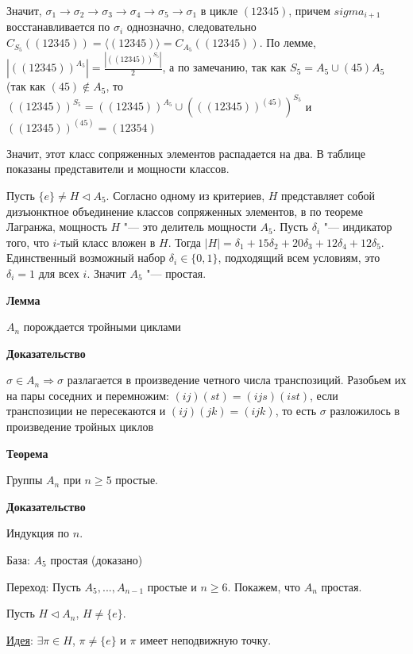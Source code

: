\documentclass{article}
\begin{document}
Значит, $\sigma_1 \rightarrow \sigma_2 \rightarrow \sigma_3 \rightarrow \sigma_4 \rightarrow \sigma_5 \rightarrow \sigma_1$ в цикле $(1 2 3 4 5)$, причем $sigma_{i+1}$ восстанавливается по $\sigma_i$ однозначно, следовательно $C_{S_5}((1 2 3 4 5)) = \langle (1 2 3 4 5) \rangle = C_{A_5}((1 2 3 4 5))$. По лемме, $|((1 2 3 4 5))^{A_5}| = \frac{|((1 2 3 4 5))^{S_5}|}{2}$, а по замечанию, так как  $S_5 = A_5 \cup (4 5)A_5$ (так как $(4 5) \notin A_5$, то $((1 2 3 4 5))^{S_5} = ((1 2 3 4 5))^{A_5} \cup (((1 2 3 4 5))^{(4 5)})^{S_5}$ и $((1 2 3 4 5))^{(4 5)} = (1 2 3 5 4)$

Значит, этот класс сопряженных элементов распадается на два. В таблице показаны представители и мощности классов.

Пусть $\{e\} \neq H \triangleleft A_5$. Согласно одному из критериев, $H$ представляет собой дизъюнктное объединение классов сопряженных элементов, в по теореме Лагранжа, мощность $H$ "--- это делитель мощности $A_5$. Пусть $\delta_i$ "--- индикатор того, что $i$-тый класс вложен в $H$. Тогда $|H| = \delta_1 + 15\delta_2 + 20\delta_3 + 12\delta_4 + 12\delta_5$. Единственный возможный набор $\delta_i \in \{0, 1\}$, подходящий всем условиям, это $\delta_i = 1$ для всех $i$. Значит $A_5$ "--- простая.

\vspace{10pt}

\textbf{Лемма}

$A_n$ порождается тройными циклами  

\textbf{Доказательство}

$\sigma \in A_n \Rightarrow \sigma$ разлагается в произведение четного числа транспозиций. Разобьем их на пары соседних и перемножим: $(i j)(s t) = (i j s)(i s t)$, если транспозиции не пересекаются и $(i j)(j k) = (i j k)$, то есть $\sigma$ разложилось в произведение тройных циклов

\vspace{10pt}

\textbf{Теорема}

Группы $A_n$ при $n \geq 5$ простые.

\textbf{Доказательство}

Индукция по $n$.

База: $A_5$ простая (доказано)

Переход: Пусть $A_5, ..., A_{n-1}$ простые и $n \geq 6$. Покажем, что $A_n$ простая.

Пусть $H \triangleleft A_n$, $H \neq \{e\}$.

\underline{Идея}: $\exists \pi \in H$, $\pi \neq \{e\}$ и $\pi$ имеет неподвижную точку.
\end{document}
